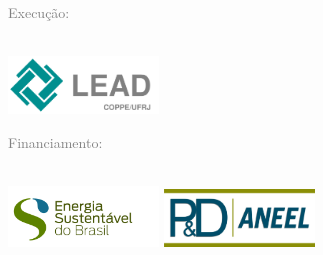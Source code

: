 





\thispagestyle{empty}


\hypersetup{pageanchor=false}

\vspace{4cm}

 \textcolor{gray}{Execução:} \\
\\
\begin{minipage}{\textwidth}
	\centering
       
	\includegraphics[width=0.3\textwidth]{logos/lead-logo}
	
\end{minipage}

\vspace{2cm}

\textcolor{gray}{Financiamento: } \\ 
\\
\begin{minipage}{\textwidth}
	\centering
	
	\includegraphics[width=0.3\textwidth]{logos/esbr-logo}
	\includegraphics[width=0.3\textwidth]{logos/aneel-logo}

	
\end{minipage}

